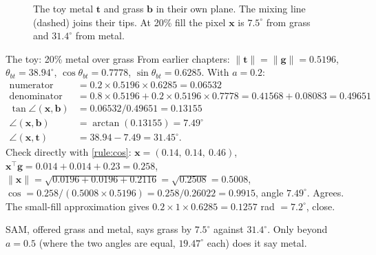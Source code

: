 \documentclass[11pt,a4paper,oneside,openany]{book}
\newcommand{\B}[1]{{\symbf{#1}}}
\newcommand{\B}[1]{{\bm{#1}}}
\newcommand{\T}{^{\top}}
\newcommand{\nrm}[1]{\lVert #1\rVert}
\newcommand{\vx}{\B{x}}
\newcommand{\vt}{\B{t}}
\newcommand{\vb}{\B{b}}
\newcommand{\vg}{\B{g}}
\begin{document}
\begin{figure}[ht]
\centering
{}
\caption{The toy metal $\vt$ and grass $\vb$ in their own plane. The mixing line (dashed) joins their tips. At 20\% fill the pixel $\vx$ is
$7.5^\circ$ from grass and $31.4^\circ$ from metal.}
\label{fig:samplane}
\end{figure}

\begin{worked}[label=we:samtoy]{The toy: 20\% metal over grass}
From earlier chapters: $\nrm{\vt}=\nrm{\vg}=0.5196$, $\theta_{bt}=38.94^\circ$, $\cos\theta_{bt}=0.7778$, $\sin\theta_{bt}=0.6285$. With $a=0.2$:
\begin{align*}
\text{numerator} &= 0.2\times0.5196\times0.6285=0.06532\\
\text{denominator} &= 0.8\times0.5196+0.2\times0.5196\times0.7778=0.41568+0.08083=0.49651\\
\tan\angle(\vx,\vb) &= 0.06532/0.49651=0.13155\\
\angle(\vx,\vb) &= \arctan(0.13155)=7.49^\circ\\
\angle(\vx,\vt) &= 38.94-7.49=31.45^\circ .
\end{align*}
Check directly with \cref{rule:cos}: $\vx=(0.14,\ 0.14,\ 0.46)$, $\vx\T\vg=0.014+0.014+0.23=0.258$, $\nrm{\vx}=\sqrt{0.0196+0.0196+0.2116}=\sqrt{0.2508}=0.5008$,
$\cos=0.258/(0.5008\times0.5196)=0.258/0.26022=0.9915$, angle $7.49^\circ$. Agrees. The small-fill approximation gives
$0.2\times1\times0.6285=0.1257$ rad $=7.2^\circ$, close.

SAM, offered grass and metal, says grass by $7.5^\circ$ against $31.4^\circ$. Only beyond $a=0.5$ (where the two angles are equal, $19.47^\circ$ each) does
it say metal.
\end{worked}
\end{document}
